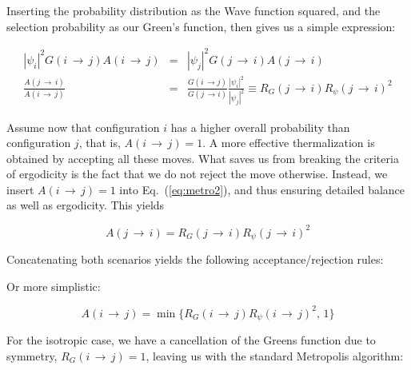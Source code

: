 Inserting the probability distribution as the Wave function squared, and the selection probability as our Green's function, then gives us a simple expression:

\begin{eqnarray}
  \label{eq:metro2}
  |\psi_i|^2G(i\,\rightarrow\,j)A(i\,\rightarrow\,j) &=& |\psi_j|^2G(j\,\rightarrow\,i)A(j\,\rightarrow\,i) \nonumber \\
  \frac{A(j\,\rightarrow\,i)}{A(i\,\rightarrow\,j)} &=& \frac{G(i\,\rightarrow j)}{G(j\,\rightarrow i)}\frac{|\psi_i|^2}{|\psi_j|^2} \equiv R_G(j\,\rightarrow\,i)R_\psi(j\,\rightarrow\,i)^2
\end{eqnarray}

Assume now that configuration $i$ has a higher overall probability than configuration $j$, that is, $A(i\,\rightarrow\,j) = 1$. A more effective thermalization is obtained by accepting all these moves. What saves us from breaking the criteria of ergodicity is the fact that we do not reject the move otherwise. Instead, we insert $A(i\,\rightarrow\,j) = 1$ into Eq.~(\ref{eq:metro2}), and thus ensuring detailed balance as well as ergodicity. This yields

\begin{equation*}
 A(j\,\rightarrow\,i) = R_G(j\,\rightarrow\,i)R_\psi(j\,\rightarrow\,i)^2
\end{equation*}


Concatenating both scenarios yields the following acceptance/rejection rules:


Or more simplistic:

\begin{equation}
  A(i\,\rightarrow\,j) = \min\{R_G(i\,\rightarrow\,j)R_\psi(i\,\rightarrow\,j)^2, \,1\}
\end{equation}


For the isotropic case, we have a cancellation of the Greens function due to symmetry, $R_G(i\,\rightarrow\,j) = 1$, leaving us with the standard Metropolis algorithm:

